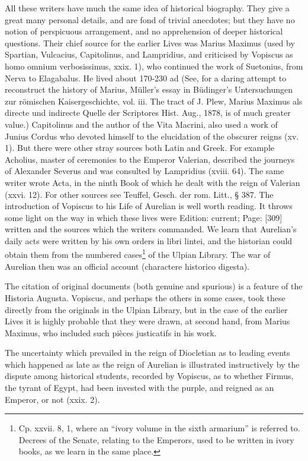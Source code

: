 All these writers have much the same idea of historical biography. They give a great many personal details, and are fond of trivial anecdotes; but they have no notion of perspicuous arrangement, and no apprehension of deeper historical questions. Their chief source for the earlier Lives was Marius Maximus (used by Spartian, Vulcacius, Capitolinus, and Lampridius, and criticised by Vopiscus as homo omnium verbosissimus, xxix. 1), who continued the work of Suetonius, from Nerva to Elagabalus. He lived about 170-230 ad (See, for a daring attempt to reconstruct the history of Marius, Müller\texthebrew{}’s essay in Büdinger\texthebrew{}’s Untersuchungen zur römischen Kaisergeschichte, vol. iii. The tract of J. Plew, Marius Maximus als directe und indirecte Quelle der Scriptores Hist. Aug., 1878, is of much greater value.) Capitolinus and the author of the Vita Macrini, also used a work of Junius Cordus who devoted himself to the elucidation of the obscurer reigns (xv. 1). But there were other stray sources both Latin and Greek. For example Acholius, master of ceremonies to the Emperor Valerian, described the journeys of Alexander Severus and was consulted by Lampridius (xviii. 64). The same writer wrote Acta, in the ninth Book of which he dealt with the reign of Valerian (xxvi. 12). For other sources see Teuffel, Gesch. der rom. Litt., § 387. The introduction of Vopiscus to his Life of Aurelian is well worth reading. It throws some light on the way in which these lives were Edition: current; Page: [309] written and the sources which the writers commanded. We learn that Aurelian\texthebrew{}’s daily acts were written by his own orders in libri lintei, and the historian could obtain them from the numbered cases\footnote{Cp. xxvii. 8, 1, where an \texthebrew{“}ivory volume in the sixth armarium\texthebrew{}” is referred to. Decrees of the Senate, relating to the Emperors, used to be written in ivory books, as we learn in the same place.} of the Ulpian Library. The war of Aurelian then was an official account (charactere historico digesta).

The citation of original documents (both genuine and spurious) is a feature of the Historia Augusta. Vopiscus, and perhaps the others in some cases, took these directly from the originals in the Ulpian Library, but in the case of the earlier Lives it is highly probable that they were drawn, at second hand, from Marius Maximus, who included such pièces justicatifs in his work.

The uncertainty which prevailed in the reign of Diocletian as to leading events which happened as late as the reign of Aurelian is illustrated instructively by the dispute among historical students, recorded by Vopiscus, as to whether Firmus, the tyrant of Egypt, had been invested with the purple, and reigned as an Emperor, or not (xxix. 2).

